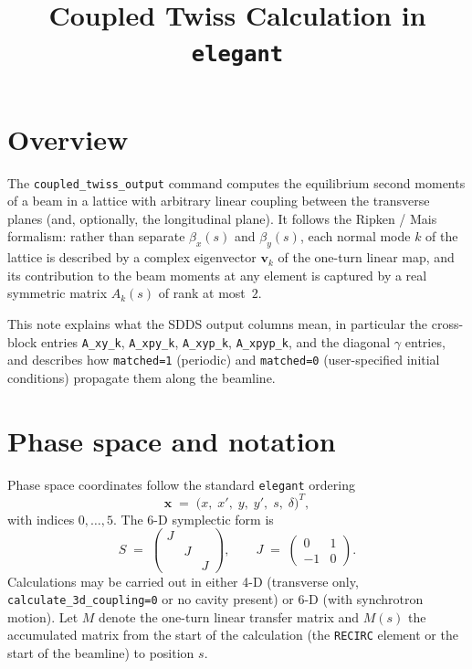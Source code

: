 \documentclass[11pt]{article}
\title{Coupled Twiss Calculation in \texttt{elegant}}
\author{}
\date{}
\begin{document}
\maketitle

\section{Overview}

The \verb|coupled_twiss_output| command computes the equilibrium second
moments of a beam in a lattice with arbitrary linear coupling between the
transverse planes (and, optionally, the longitudinal plane). It follows the
Ripken / Mais formalism: rather than separate $\beta_x(s)$ and $\beta_y(s)$,
each normal mode $k$ of the lattice is described by a complex eigenvector
$\mathbf{v}_k$ of the one-turn linear map, and its contribution to the beam
moments at any element is captured by a real symmetric matrix $A_k(s)$ of
rank at most~$2$.

This note explains what the SDDS output columns mean, in particular the
cross-block entries \verb|A_xy_k|, \verb|A_xpy_k|, \verb|A_xyp_k|,
\verb|A_xpyp_k|, and the diagonal $\gamma$ entries, and describes how
\verb|matched=1| (periodic) and \verb|matched=0| (user-specified initial
conditions) propagate them along the beamline.

\section{Phase space and notation}

Phase space coordinates follow the standard \texttt{elegant} ordering
\[
   \mathbf{x} \;=\; \bigl( x,\;x',\;y,\;y',\;s,\;\delta \bigr)^T ,
\]
with indices $0,\dots,5$. The 6-D symplectic form is
\[
   S \;=\;
   \begin{pmatrix} J & & \\ & J & \\ & & J \end{pmatrix} ,
   \qquad
   J \;=\; \begin{pmatrix} 0 & 1 \\ -1 & 0 \end{pmatrix} .
\]
Calculations may be carried out in either 4-D (transverse only,
\verb|calculate_3d_coupling=0| or no cavity present) or 6-D (with synchrotron
motion). Let $M$ denote the one-turn linear transfer matrix and $M(s)$ the
accumulated matrix from the start of the calculation (the \verb|RECIRC|
element or the start of the beamline) to position $s$.
\end{document}
